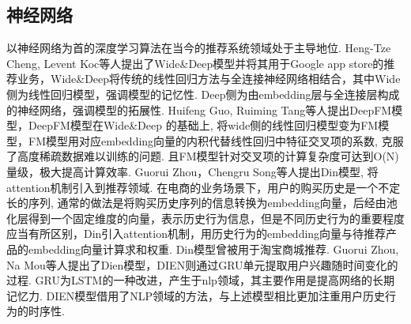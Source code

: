 \subsection{神经网络}
以神经网络为首的深度学习算法在当今的推荐系统领域处于主导地位.
Heng-Tze Cheng, Levent Koc等人提出了Wide\&Deep模型并将其用于Google app store的推荐业务，Wide\&Deep将传统的线性回归方法与全连接神经网络相结合，其中Wide侧为线性回归模型，强调模型的记忆性. Deep侧为由embedding层与全连接层构成的神经网络，强调模型的拓展性. 
Huifeng Guo, Ruiming Tang等人提出DeepFM模型，DeepFM模型在Wide\&Deep
的基础上, 将wide侧的线性回归模型变为FM模型，FM模型用对应embedding向量的内积代替线性回归中特征交叉项的系数, 克服了高度稀疏数据难以训练的问题. 且FM模型针对交叉项的计算复杂度可达到O(N)量级，极大提高计算效率. 
Guorui Zhou，Chengru Song等人提出Din模型, 将attention机制引入到推荐领域.
在电商的业务场景下，用户的购买历史是一个不定长的序列, 通常的做法是将购买历史序列的信息转换为embedding向量，后经由池化层得到一个固定维度的向量，表示历史行为信息，但是不同历史行为的重要程度应当有所区别，Din引入attention机制，用历史行为的embedding向量与待推荐产品的embedding向量计算求和权重. Din模型曾被用于淘宝商城推荐.
Guorui Zhou, Na Mou等人提出了Dien模型，DIEN则通过GRU单元提取用户兴趣随时间变化的过程. GRU为LSTM的一种改进，产生于nlp领域，其主要作用是提高网络的长期记忆力. DIEN模型借用了NLP领域的方法，与上述模型相比更加注重用户历史行为的时序性.































